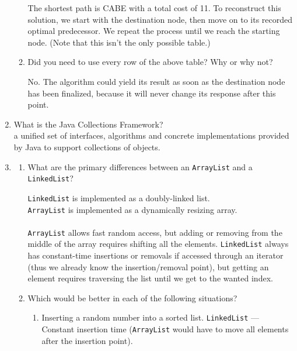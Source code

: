 \documentclass[11pt]{article}
\newenvironment{answer}{\large\lstset{basicstyle=\tiny\ttfamily}\color{white} }{}
\newenvironment{answer}{\large\lstset{basicstyle=\large\ttfamily}\color{red} }{}
\begin{document}
\begin{enumerate}
\begin{enumerate}
\begin{answer}
The shortest path is CABE with a total cost of 11.
To reconstruct this solution, we start with the destination node, then move on to its recorded optimal predecessor.
We repeat the process until we reach the starting node.
(Note that this isn't the only possible table.)
\end{answer}

\item
Did you need to use every row of the above table? Why or why not?

\begin{answer}
No. The algorithm could yield its result as soon as the destination node has been finalized, because it will never change its response after this point.
\end{answer}
\end{enumerate}


\newpage
\item What is the Java Collections Framework? \\
\begin{answer}
    a unified set of interfaces, algorithms and concrete implementations
provided by Java to support collections of objects.
\end{answer}


\vspace{24pt}
\item
\begin{enumerate}
	\item What are the primary differences between an \texttt{ArrayList} and a \texttt{LinkedList}?
	
	\begin{answer}
	\texttt{LinkedList} is implemented as a doubly-linked list.
	\\\texttt{ArrayList} is implemented as a dynamically resizing array.
	\\ \\\texttt{ArrayList} allows fast random access, but adding or removing from the middle of the array
	requires shifting all the elements. \texttt{LinkedList} always has constant-time insertions or removals
	if accessed through an iterator (thus we already know the insertion/removal point), but getting
	an element requires traversing the list until we get to the wanted index.
	
	\end{answer}
	
	\item Which would be better in each of the following situations?
	\begin{enumerate}
		\item Inserting a random number into a sorted list.
		\begin{answer}
		\texttt{LinkedList} --- Constant insertion time (\texttt{ArrayList} would have to move all elements after the insertion point).
		\end{answer}
		

\end{enumerate}
\end{enumerate}
\end{enumerate}
\end{document}
